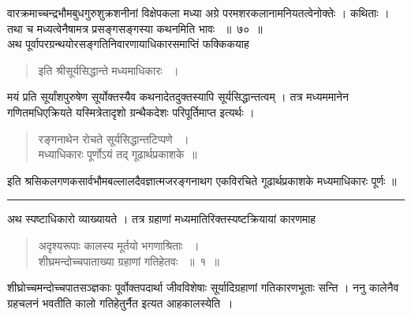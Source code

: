 \documentclass[11pt, openany]{book}
\begin{document}
\begin{sloppypar}

\noindent वारक्रमाच्चन्द्रभौमबुधगुरुशुक्रशनीनां विक्षेपकला मध्या अग्रे परमशरकलानामनियतत्वेनोक्तेः । कथिताः । तथा च मध्यत्वेनैषामत्र प्रसङ्गसङ्गस्या कथनमिति भावः ~॥~७०~॥\\ 
\noindent अथ पूर्वापरग्रन्थयोरसङ्गतिनिवारणायाधिकारसमाप्तिं फक्किकयाह\textendash
\end{sloppypar}
\begin{quote}

इति श्रीसूर्यसिद्धान्ते मध्यमाधिकारः ~।
\end{quote}
\begin{sloppypar}
मयं प्रति सूर्यांशपुरुषेण सूर्योक्तस्यैव कथनादेतदुक्तस्यापि सूर्यसिद्धान्तत्वम् । तत्र मध्यममानेन गणितमधिएक्रियते यस्मित्रेतादृशो ग्रन्थैकदेशः परिपूर्तिमाप्त इत्यर्थः ।
\end{sloppypar}
\begin{quote}

{\ssi रङ्गनाथेन रोचते सूर्यसिद्धान्तटिप्पणे ~।\\
मध्याधिकारः पूर्णोऽयं तद् गूढार्थप्रकाशके~॥ }
\end{quote}
\begin{sloppypar}
इति श्रसिकलगणकसार्वभौमबल्लालदैवज्ञात्मजरङ्गनाथग एकविरचिते गूढार्थप्रकाशके मध्यमाधिकारः पूर्णः ॥
\end{sloppypar}

{\setlength{\parindent}{12em}\rule{7em}{.5pt}}
\vspace{2mm}
\begin{sloppypar}
अथ स्पष्टाधिकारो व्याख्यायते । तत्र ग्रहाणां मध्यमातिरिक्तस्यष्टक्रियायां कारणमाह\textendash
\end{sloppypar}
\begin{quote}

{\ssi अदृश्यरूपाः कालस्य मूर्तयो भगणाश्रिताः ~।\\
शीघ्रमन्दोच्चपाताख्या ग्रहाणां गतिहेतवः ~॥~१~॥}
\end{quote}
\begin{sloppypar}
शीघ्रोच्चमन्दोच्चपातसञ्ज्ञकाः पूर्वोक्तपदार्था जीवविशेषाः सूर्यादिग्रहाणां गतिकारणभूताः सन्ति । ननु कालेनैव ग्रहचलनं भवतीति कालो गतिहेतुर्नैत इत्यत आह\textendash कालस्येति~।
\end{sloppypar}
\end{document}
